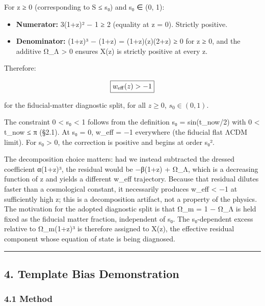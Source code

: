 For z ≥ 0 (corresponding to S ≤ s₀) and s₀ ∈ (0, 1):

\begin{itemize}
\tightlist
\item
  \textbf{Numerator:} 3(1+z)² − 1 ≥ 2 (equality at z = 0). Strictly
  positive.
\item
  \textbf{Denominator:} (1+z)³ − (1+z) = (1+z)(z)(2+z) ≥ 0 for z ≥ 0,
  and the additive Ω\_Λ \textgreater{} 0 ensures X(z) is strictly
  positive at every z.
\end{itemize}

Therefore:

\[\boxed{w_{\rm eff}(z) > -1}\]

for the fiducial-matter diagnostic split, for all \(z \geq 0\),
\(s_0 \in (0, 1)\).

The constraint 0 \textless{} s₀ \textless{} 1 follows from the
definition s₀ = sin(t\_now/2) with 0 \textless{} t\_now ≤ π (§2.1). At
s₀ = 0, w\_eff = −1 everywhere (the fiducial flat ΛCDM limit). For s₀
\textgreater{} 0, the correction is positive and begins at order s₀².

The decomposition choice matters: had we instead subtracted the dressed
coefficient α(1+z)³, the residual would be −β(1+z) + Ω\_Λ, which is a
decreasing function of z and yields a different w\_eff trajectory.
Because that residual dilutes faster than a cosmological constant, it
necessarily produces w\_eff \textless{} −1 at sufficiently high z; this
is a decomposition artifact, not a property of the physics. The
motivation for the adopted diagnostic split is that Ω\_m = 1 − Ω\_Λ is
held fixed as the fiducial matter fraction, independent of s₀. The
s₀-dependent excess relative to Ω\_m(1+z)³ is therefore assigned to
X(z), the effective residual component whose equation of state is being
diagnosed.

\begin{center}\rule{0.5\linewidth}{0.5pt}\end{center}

\subsection{4. Template Bias
Demonstration}\label{template-bias-demonstration}

\subsubsection{4.1 Method}\label{method}

